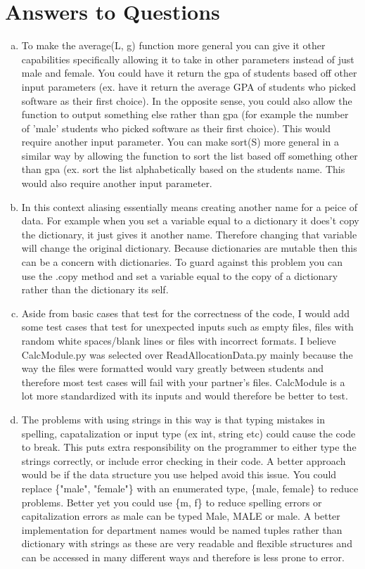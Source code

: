 \documentclass[12pt]{article}
\begin{document}
\section{Answers to Questions}

\begin{enumerate}[(a)]

\item To make the average(L, g) function more general you can give it other capabilities specifically allowing it to take in other parameters instead of just male and female. You could have it return the gpa of students based off other input parameters (ex. have it return the average GPA of students who picked software as their first choice). In the opposite sense, you could also allow the function to output something else rather than gpa (for example the number of 'male' students who picked software as their first choice). This would require another input parameter. You can make sort(S) more general in a similar way by allowing the function to sort the list based off something other than gpa (ex. sort the list alphabetically based on the students name. This would also require another input parameter. 

\item In this context aliasing essentially means creating another name for a peice of data. For example when you set a variable equal to a dictionary it does't copy the dictionary, it just gives it another name. Therefore changing that variable will change the original dictionary. Because dictionaries are mutable then this can be a concern with dictionaries. To guard against this problem you can use the .copy method and set a variable equal to the copy of a dictionary rather than the dictionary its self. 

\item Aside from basic cases that test for the correctness of the code, I would add some test cases that test for unexpected inputs such as empty files, files with random white spaces/blank lines or files with incorrect formats. I believe CalcModule.py was selected over ReadAllocationData.py mainly because the way the files were formatted would vary greatly between students and therefore most test cases will fail with your partner's files. CalcModule is a lot more standardized with its inputs and would therefore be better to test. 

\item The problems with using strings in this way is that typing mistakes in spelling, capatalization or input type (ex int, string etc)  could cause the code to break. This puts extra responsibility on the programmer to either type the strings correctly, or include error checking in their code. A better approach would be if the data structure you use helped avoid this issue. You could replace \{"male", "female"\} with an enumerated type, \{male, female\} to reduce problems. Better yet you could use \{m, f\} to reduce spelling errors or capitalization errors as male can be typed Male, MALE or male. A better implementation for department names would be named tuples rather than dictionary with strings as these are very readable and flexible structures and can be accessed in many different ways and therefore is less prone to error. 


\end{enumerate}
\end{document}
